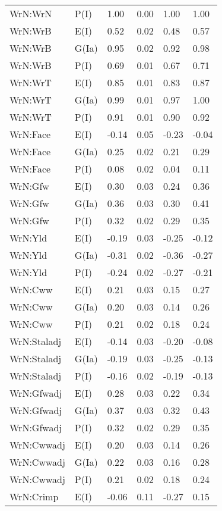 \begin{center}
\begin{longtable}{|p{1.1in}|p{0.7in}|p{0.7in}|p{0.6in}|p{0.6in}|p{0.6in}|}
  WrN:WrN & P(I) & 1.00 & 0.00 & 1.00 & 1.00 \\ 
  WrN:WrB & E(I) & 0.52 & 0.02 & 0.48 & 0.57 \\ 
  WrN:WrB & G(Ia) & 0.95 & 0.02 & 0.92 & 0.98 \\ 
  WrN:WrB & P(I) & 0.69 & 0.01 & 0.67 & 0.71 \\ 
  WrN:WrT & E(I) & 0.85 & 0.01 & 0.83 & 0.87 \\ 
  WrN:WrT & G(Ia) & 0.99 & 0.01 & 0.97 & 1.00 \\ 
  WrN:WrT & P(I) & 0.91 & 0.01 & 0.90 & 0.92 \\ 
  WrN:Face & E(I) & -0.14 & 0.05 & -0.23 & -0.04 \\ 
  WrN:Face & G(Ia) & 0.25 & 0.02 & 0.21 & 0.29 \\ 
  WrN:Face & P(I) & 0.08 & 0.02 & 0.04 & 0.11 \\ 
  WrN:Gfw & E(I) & 0.30 & 0.03 & 0.24 & 0.36 \\ 
  WrN:Gfw & G(Ia) & 0.36 & 0.03 & 0.30 & 0.41 \\ 
  WrN:Gfw & P(I) & 0.32 & 0.02 & 0.29 & 0.35 \\ 
  WrN:Yld & E(I) & -0.19 & 0.03 & -0.25 & -0.12 \\ 
  WrN:Yld & G(Ia) & -0.31 & 0.02 & -0.36 & -0.27 \\ 
  WrN:Yld & P(I) & -0.24 & 0.02 & -0.27 & -0.21 \\ 
  WrN:Cww & E(I) & 0.21 & 0.03 & 0.15 & 0.27 \\ 
  WrN:Cww & G(Ia) & 0.20 & 0.03 & 0.14 & 0.26 \\ 
  WrN:Cww & P(I) & 0.21 & 0.02 & 0.18 & 0.24 \\ 
  WrN:Staladj & E(I) & -0.14 & 0.03 & -0.20 & -0.08 \\ 
  WrN:Staladj & G(Ia) & -0.19 & 0.03 & -0.25 & -0.13 \\ 
  WrN:Staladj & P(I) & -0.16 & 0.02 & -0.19 & -0.13 \\ 
  WrN:Gfwadj & E(I) & 0.28 & 0.03 & 0.22 & 0.34 \\ 
  WrN:Gfwadj & G(Ia) & 0.37 & 0.03 & 0.32 & 0.43 \\ 
  WrN:Gfwadj & P(I) & 0.32 & 0.02 & 0.29 & 0.35 \\ 
  WrN:Cwwadj & E(I) & 0.20 & 0.03 & 0.14 & 0.26 \\ 
  WrN:Cwwadj & G(Ia) & 0.22 & 0.03 & 0.16 & 0.28 \\ 
  WrN:Cwwadj & P(I) & 0.21 & 0.02 & 0.18 & 0.24 \\ 
  WrN:Crimp & E(I) & -0.06 & 0.11 & -0.27 & 0.15 \\ 

\end{longtable}
\end{center}
